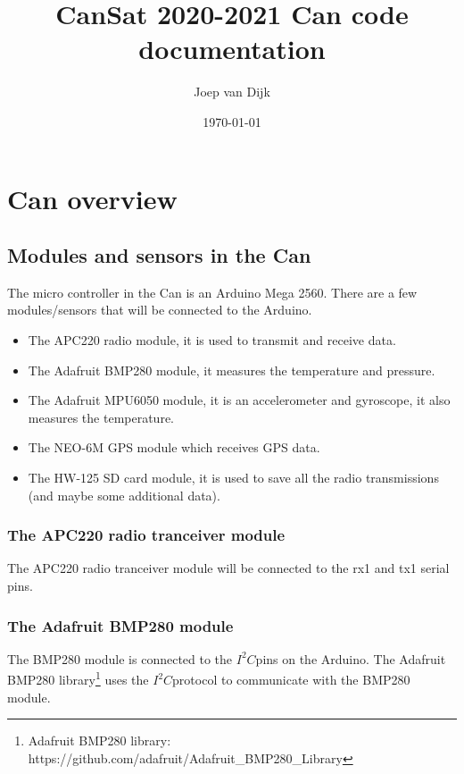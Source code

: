 \documentclass[a4paper,10pt]{article}
\author{Joep van Dijk}
\title{CanSat 2020-2021 Can code documentation}
\date{\today}
\newcommand{\isqc}{$I^2C$}
\begin{document}
	\maketitle
	
	\clearpage
	
	\tableofcontents
	
	\clearpage
	
	
	
	\section[Can]{Can overview}
		\subsection[Modules]{Modules and sensors in the Can}
			The micro controller in the Can is an Arduino Mega 2560. There are a few modules/sensors that will be connected to the Arduino. 
			\begin{itemize}
				\item The APC220 radio module, it is used to transmit and receive data. 
				\item The Adafruit BMP280 module, it measures the temperature and pressure. 
				\item The Adafruit MPU6050 module, it is an accelerometer and gyroscope, it also measures the temperature. 
				\item The NEO-6M GPS module which receives GPS data. 
				\item The HW-125 SD card module, it is used to save all the radio transmissions (and maybe some additional data). 
			\end{itemize}
			
			\vspace{1ex}
			
			\subsubsection[APC220]{The APC220 radio tranceiver module}
				The APC220 radio tranceiver module will be connected to the rx1 and tx1 serial pins. 
			
			\vspace{1ex}
			
			\subsubsection[BMP280]{The Adafruit BMP280 module}
				The BMP280 module is connected to the \isqc pins on the Arduino. The Adafruit BMP280 library\footnote{Adafruit BMP280 library: https://github.com/adafruit/Adafruit\_BMP280\_Library} uses the \isqc protocol to communicate with the BMP280 module. 
	
	
	
\end{document}
